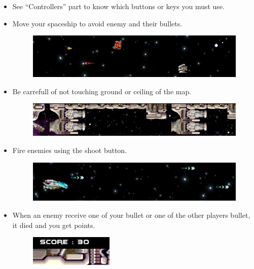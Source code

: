\documentclass{koala-fr}
\begin{document}
\begin{itemize}
  \item See ``Controllers'' part to know which buttons or keys you must use.
  \item Move your spaceship to avoid enemy and their bullets.
    \begin{figure}[H]
      \begin{center}
        \includegraphics[width=15cm]{enemys.jpg}
      \end{center}
    \end{figure}
  \item Be carrefull of not touching ground or ceiling of the map.
    \begin{figure}[H]
      \begin{center}
        \includegraphics[width=15cm]{decor.jpg}
      \end{center}
    \end{figure}
  \item Fire enemies using the shoot button.
    \begin{figure}[H]
      \begin{center}
        \includegraphics[width=15cm]{ownbullet.jpg}
      \end{center}
    \end{figure}
  \item When an enemy receive one of your bullet or one of the other players bullet, it died and you get points.
    \begin{figure}[H]
      \begin{center}
        \includegraphics[width=4cm]{scores.jpg}

\end{center}
\end{figure}
\end{itemize}
\end{document}
